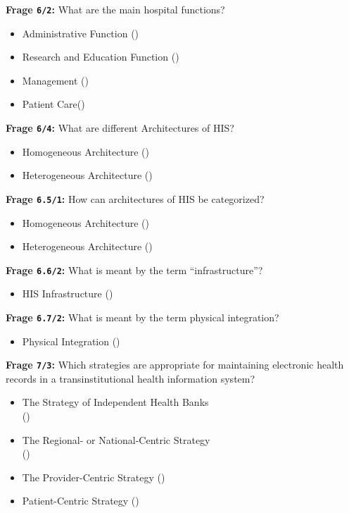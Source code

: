\textbf{Frage \texttt{6/2}:} What are the main hospital functions?

\begin{itemize}
  \item Administrative Function ()
  \item Research and Education Function ()
  \item Management ()
  \item Patient Care()
\end{itemize}

\textbf{Frage \texttt{6/4}:} What are different Architectures of HIS?

\begin{itemize}
  \item Homogeneous Architecture ()
  \item Heterogeneous Architecture ()
\end{itemize}

\textbf{Frage \texttt{6.5/1}:} How can architectures of HIS be categorized?

\begin{itemize}
  \item Homogeneous Architecture ()
  \item Heterogeneous Architecture ()
\end{itemize}

\textbf{Frage \texttt{6.6/2}:} What is meant by the term \enquote{infrastructure}?

\begin{itemize}
  \item HIS Infrastructure ()
\end{itemize}

\textbf{Frage \texttt{6.7/2}:} What is meant by the term physical integration?

\begin{itemize}
  \item Physical Integration ()
\end{itemize}

\textbf{Frage \texttt{7/3}:} Which strategies are appropriate for maintaining electronic health records in a transinstitutional health information system?

\begin{itemize}
  \item The Strategy of Independent Health Banks \\
  ()
  \item The Regional- or National-Centric Strategy \\
  ()
  \item The Provider-Centric Strategy ()
  \item Patient-Centric Strategy ()
\end{itemize}


